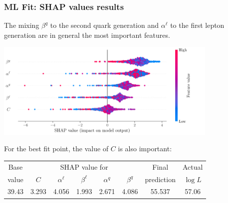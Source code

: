 \documentclass[mathserif, 10pt, dvipsnames]{beamer}
\begin{document}
\begin{frame}\frametitle{ML Fit: SHAP values results}

    The mixing \(\beta^q\) to the second quark generation and $\alpha^\ell$ to the first lepton generation are in general the most important features.
    \begin{center}
        \includegraphics[width=0.8\textwidth]{figures/SHAP_summary.pdf}
    \end{center}

    For the best fit point, the value of $C$ is also important:
    \begin{center}
        \begin{tabular}{|*{8}{c|}}\hline
            Base  & \multicolumn{5}{c|}{SHAP value for} & Final         & Actual                                                        \\ \cline{2-6}
            value & $C$                                 & $\alpha^\ell$ & $\beta^\ell$ & $\alpha^q$ & $\beta^q$ & prediction & $\log L$ \\\hline
            39.43 & 3.293                               & 4.056         & 1.993        & 2.671      & 4.086     & 55.537     & 57.06    \\\hline
        \end{tabular}
\end{center}

\end{frame}
\end{document}
